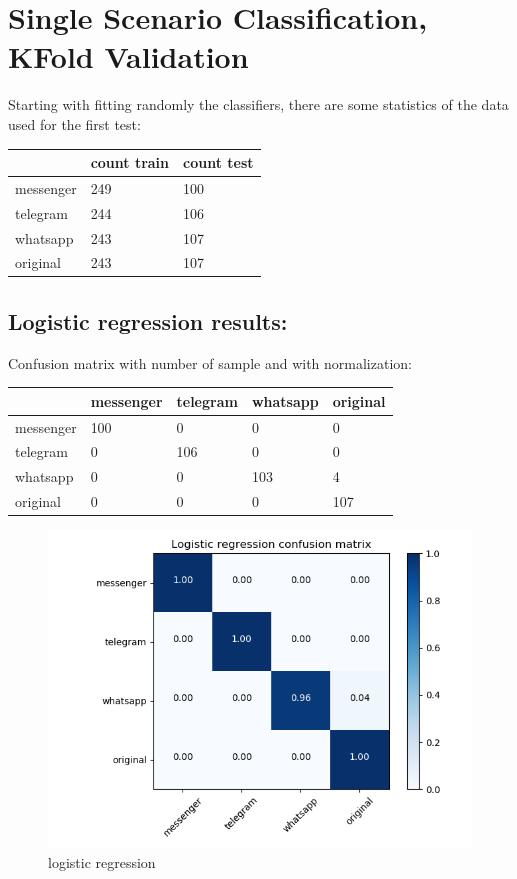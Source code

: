 \chapter{Single Scenario Classification, KFold Validation}Starting with fitting randomly the classifiers, there are some statistics of the data used for the first test: \\
 {\def\arraystretch{1.3} 
 \begin{table}[H] 
\centering 
\begin{tabular}{|l|l|l|} 
\hline 
  &count train  &count test  \\ \hline
messenger  &249  &100  \\ \hline
telegram  &244  &106  \\ \hline
whatsapp  &243  &107  \\ \hline
original  &243  &107  \\ \hline
\end{tabular} 
\end{table} }
\section{Logistic regression results:} 
Confusion matrix with number of sample and with normalization:
 {\def\arraystretch{1.3} 
 \begin{table}[H] 
\centering 
\begin{tabular}{|l|l|l|l|l|} 
\hline 
  &messenger  &telegram  &whatsapp  &original  \\ \hline
messenger  &100  &0  &0  &0  \\ \hline
telegram  &0  &106  &0  &0  \\ \hline
whatsapp  &0  &0  &103  &4  \\ \hline
original  &0  &0  &0  &107  \\ \hline
\end{tabular} 
\end{table} }

 \begin{figure}[H] 
\centering 
\includegraphics[scale=.6]{images/new_met_lr_initial.png} 
\caption{logistic regression} 
\end{figure} 


